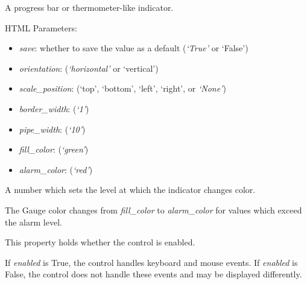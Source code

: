 \documentclass[letterpaper,10pt,english]{sphinxmanual}
\begin{document}

\begin{fulllineitems}
\label{api:qwt.Gauge}
A progress bar or thermometer-like indicator.

HTML Parameters:
\begin{itemize}
\item {} 
\emph{save}: whether to save the value as a default (\emph{`True'} or `False')

\item {} 
\emph{orientation}: (\emph{`horizontal'} or `vertical')

\item {} 
\emph{scale\_position}: (`top', `bottom', `left', `right', or \emph{`None'})

\item {} 
\emph{border\_width}: (\emph{`1'})

\item {} 
\emph{pipe\_width}: (\emph{`10'})

\item {} 
\emph{fill\_color}: (\emph{`green'})

\item {} 
\emph{alarm\_color}: (\emph{`red'})

\end{itemize}

\begin{fulllineitems}
\label{api:qwt.Gauge.alarm}
A number which sets the level at which the indicator changes color.

The Gauge color changes from \emph{fill\_color} to \emph{alarm\_color} for values
which exceed the alarm level.

\end{fulllineitems}


\begin{fulllineitems}
\label{api:qwt.Gauge.enabled}
This property holds whether the control is enabled.

If \emph{enabled} is True, the control handles keyboard and mouse events.
If \emph{enabled} is False, the control does not handle these events and may
be displayed differently.

\end{fulllineitems}


\end{fulllineitems}
\end{document}
